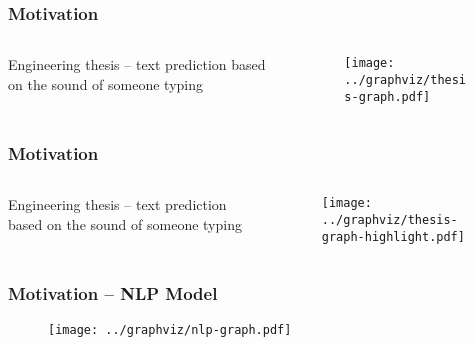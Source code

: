 \documentclass[../main.tex]{subfiles}
\begin{document}
\begin{frame}
	\frametitle{Motivation}
	\begin{columns}
		\begin{column}{.68\textwidth}
			Engineering thesis -- text prediction based on the sound of someone
			typing
		\end{column}
		\begin{column}{0.28\textwidth}
			\begin{figure}
				\texttt{[image: ../graphviz/thesis-graph.pdf]}
			\end{figure}
		\end{column}
	\end{columns}
\end{frame}

\begin{frame}
	\frametitle{Motivation}
	\begin{columns}
		\begin{column}{.68\textwidth}
			Engineering thesis -- text prediction based on the sound of someone
			typing
		\end{column}
		\begin{column}{0.28\textwidth}
			\begin{figure}
				\texttt{[image: ../graphviz/thesis-graph-highlight.pdf]}
			\end{figure}
		\end{column}
	\end{columns}
\end{frame}

\begin{frame}
	\frametitle{Motivation -- NLP Model}
	\begin{figure}
		\texttt{[image: ../graphviz/nlp-graph.pdf]}
	\end{figure}
\end{frame}
\end{document}
